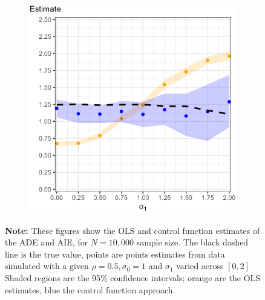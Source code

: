 \begin{figure}[h!]
\begin{subfigure}[c]{0.475\textwidth}
        \includegraphics[width=\textwidth]{
            ../programs/simulations/sim-output/sigma-1-indirecteffect-bias.png}
    \end{subfigure}
    \label{fig:sigma-1-bias}
    \justify
    \footnotesize    
    \textbf{Note:}
    These figures show the OLS and control function estimates of the ADE and AIE, for $N = 10,000$ sample size.
    The black dashed line is the true value, points are points estimates from data simulated with a given $\rho = 0.5, \sigma_0 = 1$ and $\sigma_1$ varied across $[0, 2]$
    Shaded regions are the 95\% confidence intervals;
    orange are the OLS estimates, blue the control function approach.
\end{figure}
